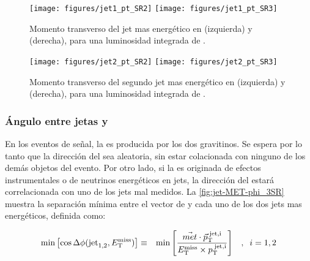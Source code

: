 
\begin{figure}[th!]
  \centering
  \texttt{[image: figures/jet1\_pt\_SR2]}
  \texttt{[image: figures/jet1\_pt\_SR3]}
  \caption{Momento transverso del jet mas energético en {\SRL} (izquierda) y {\SRH} (derecha),
    para una luminosidad integrada de {\ilumi}.}
  \label{fig:jetlead_3SR}
\end{figure}

\begin{figure}[th!]
 \centering
 \texttt{[image: figures/jet2\_pt\_SR2]}
 \texttt{[image: figures/jet2\_pt\_SR3]}
  \caption{Momento transverso del segundo jet mas energético en {\SRL} (izquierda) y {\SRH} (derecha),
    para una luminosidad integrada de {\ilumi}.}
 \label{fig:jetsublead_3SR}
\end{figure}

\subsubsection{Ángulo entre jetas y \etmiss}
\label{sec:dphi_obj}

En los eventos de señal, la {\met} es producida por los dos gravitinos.
Se espera por lo tanto que la dirección del {\met} sea aleatoria, sin
estar colacionada con ninguno de los demás objetos del evento.
Por otro lado, si la {\met} es originada de efectos instrumentales o de
neutrinos energéticos en jets, la dirección del {\met} estará correlacionada
con uno de los jets mal medidos. La {\fig} \ref{fig:jet-MET-phi_3SR} muestra
la separación mínima entre el vector de {\met} y cada uno de los dos jets
mas energéticos, definida como:


\begin{eqnarray} \label{eq:dphi}
  \min\left[ \cos   \Delta\phi({\rm jet}_{1,2},E_{\mathrm{T}}^{\mathrm{miss}}) \right] &\equiv&  \min \left[\frac{\vec{met} \cdot \vec{p}_{\rm T}^{\rm \; jet,i}}{E_{\mathrm{T}}^{\mathrm{miss}} \times p_{\mathrm{T}}^{\rm \; jet,i}}\right] \; \;\; , \;\; i = 1,2
\end{eqnarray}
%

